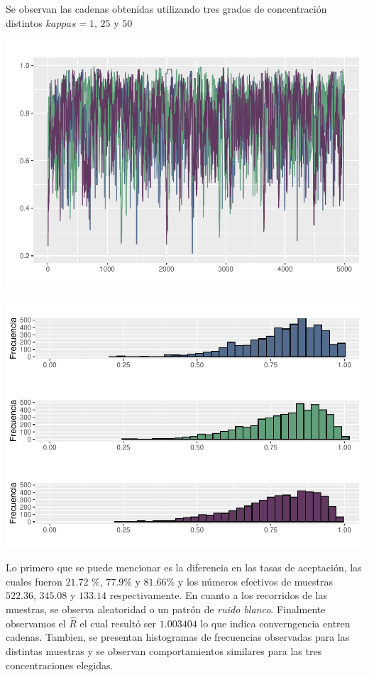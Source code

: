 \documentclass[
]{article}
\begin{document}
Se observan las cadenas obtenidas utilizando tres grados de
concentración distintos \(kappas = 1\), \(25\) y \(50\)

\begin{center}\includegraphics{informe2md_files/figure-latex/unnamed-chunk-7-1} \end{center}

\begin{center}\includegraphics{informe2md_files/figure-latex/unnamed-chunk-8-1} \end{center}

Lo primero que se puede mencionar es la diferencia en las tasas de
aceptación, las cuales fueron \(21.72\) \%, \(77.9\)\% y \(81.66\)\% y
los números efectivos de muestras \(522.36\), \(345.08\) y \(133.14\)
respectivamente. En cuanto a los recorridos de las muestras, se observa
aleatoridad o un patrón de \emph{ruido blanco}. Finalmente observamos el
\(\hat{R}\) el cual resultó ser \(1.003404\) lo que indica converngencia
entren cadenas. Tambien, se presentan histogramas de frecuencias
observadas para las distintas muestras y se observan comportamientos
similares para las tres concentraciones elegidas.
\end{document}
